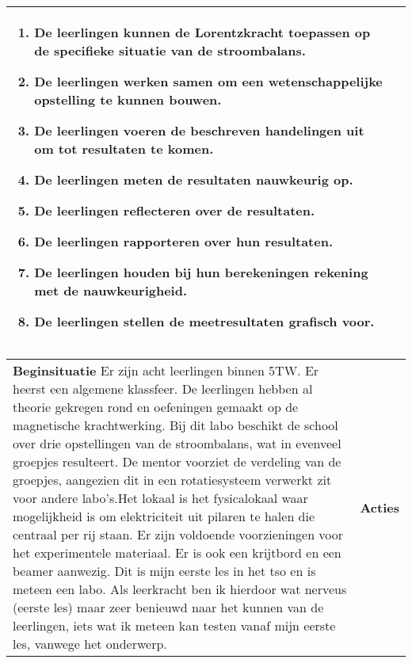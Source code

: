 \begin{landscape}
\begin{tabularx}{1.56\textwidth}{|p{}|X|}
		\vspace{-0.75cm}
		\begin{enumerate}[itemsep=0.08\baselineskip]
			\item De leerlingen kunnen de Lorentzkracht toepassen op de specifieke situatie van de stroombalans.
			\item De leerlingen werken samen om een wetenschappelijke opstelling te kunnen bouwen.
			\item De leerlingen voeren de beschreven handelingen uit om tot resultaten te komen.
			\item De leerlingen meten de resultaten nauwkeurig op.
			\item De leerlingen reflecteren over de resultaten.
			\item De leerlingen rapporteren over hun resultaten.
			\item De leerlingen houden bij hun berekeningen rekening met de nauwkeurigheid.
			\item De leerlingen stellen de meetresultaten grafisch voor.
		\end{enumerate} \\\hline
	\end{tabularx}


	\begin{tabularx}{1.56\textwidth}{|p{}|X|}
		\hline
		\multirow{2}{0.55\textwidth}{\textbf{Beginsituatie}\newline  
		Er zijn acht leerlingen binnen 5TW. Er heerst een algemene klassfeer. De leerlingen hebben al theorie gekregen  rond en oefeningen gemaakt op de magnetische krachtwerking. \newline\newline Bij dit labo beschikt de school over drie opstellingen van de stroombalans, wat in evenveel groepjes resulteert. De mentor voorziet de verdeling van de groepjes, aangezien dit in een rotatiesysteem verwerkt zit voor andere labo's.\newline\newline Het lokaal is het fysicalokaal waar mogelijkheid is om elektriciteit uit  pilaren te halen die centraal per rij staan. Er zijn voldoende voorzieningen voor het experimentele materiaal. Er is ook een krijtbord en een beamer aanwezig. \newline\newline Dit is mijn eerste les in het tso en is meteen een labo. Als leerkracht ben ik hierdoor wat nerveus (eerste les) maar zeer benieuwd naar het kunnen van de leerlingen, iets wat ik meteen kan testen vanaf mijn eerste les, vanwege het onderwerp. } & \textbf{Acties}\newline  
		

\end{tabularx}
\end{landscape}
